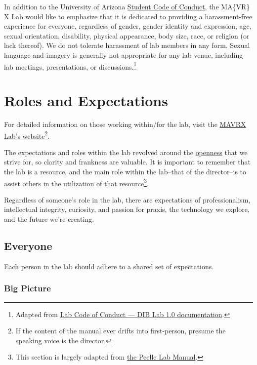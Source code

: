 \documentclass[]{tufte-book}
\begin{document}
In addition to the University of Arizona \href{https://deanofstudents.arizona.edu/student-rights-responsibilities/student-code-conduct}{Student Code of Conduct}, the MA\{VR\} X Lab would like to emphasize that it is dedicated to providing a harassment-free experience for everyone, regardless of gender, gender identity and expression, age, sexual orientation, disability, physical appearance, body size, race, or religion (or lack thereof). We do not tolerate harassment of lab members in any form. Sexual language and imagery is generally not appropriate for any lab venue, including lab meetings, presentations, or discussions.\footnote{Adapted from \href{http://ivory.idyll.org/lab/coc.html}{Lab Code of Conduct --- DIB Lab 1.0 documentation}.}

\hypertarget{roles}{%
\chapter{Roles and Expectations}\label{roles}}

For detailed information on those working within/for the lab, visit the \href{https://mavrxlab.org/people}{MAVRX Lab's website}\footnote{If the content of the manual ever drifts into first-person, presume the speaking voice is the director.}.

The expectations and roles within the lab revolved around the \protect\hyperlink{openness}{openness} that we strive for, so clarity and frankness are valuable. It is important to remember that the lab is a resource, and the main role within the lab--that of the director--is to assist others in the utilization of that resource\footnote{This section is largely adapted from \href{https://github.com/jpeelle/peellelab_manual/blob/master/peellelab_manual.pdf}{the Peelle Lab Manual}.}.

Regardless of someone's role in the lab, there are expectations of professionalism, intellectual integrity, curiosity, and passion for praxis, the technology we explore, and the future we're creating.

\hypertarget{everyone}{%
\section{Everyone}\label{everyone}}

Each person in the lab should adhere to a shared set of expectations.

\hypertarget{big-picture}{%
\subsection{Big Picture}\label{big-picture}}
\end{document}
